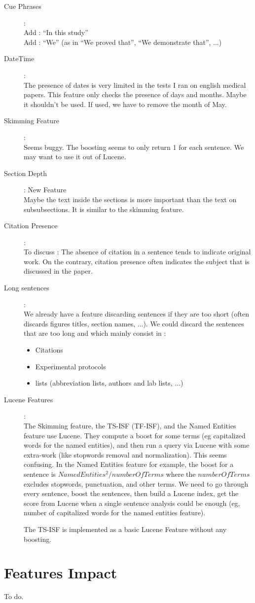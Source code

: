 \documentclass[a4paper,10pt]{article}
\begin{document}
\begin{description}
\item[Cue Phrases] : \hfill \\
  Add : ``In this study'' \\
  Add : ``We'' (as in ``We proved that'', ``We demonstrate that'',
  ...)\\
\item[DateTime] : \hfill \\
  The presence of dates is very limited in the tests I ran on english
  medical papers. This feature only checks the presence of days and
  months. Maybe it shouldn't be used. If used, we have to remove the
  month of May.

\item[Skimming Feature] : \hfill \\
  Seems buggy. The boosting seems to only return 1 for each
  sentence. We may want to use it out of Lucene.

\item[Section Depth] : New Feature \hfill \\
  Maybe the text inside the sections is more important than the text
  on subsubsections. It is similar to the skimming feature.

\item[Citation Presence] : \hfill \\
  To discuss : The absence of citation in a sentence tends to indicate
  original work. On the contrary, citation presence often indicates
  the subject that is discussed in the paper.
\item[Long sentences] : \hfill \\
  We already have a feature discarding sentences if they are too
  short (often discards figures titles, section names, ...). We could
  discard the sentences that are too long and which mainly consist in
  :
  \begin{itemize}
  \item Citations
  \item Experimental protocols
  \item lists (abbreviation lists, authors and lab lists, ...)
  \end{itemize}

\item[Lucene Features] : \hfill \\
  The Skimming feature, the TS-ISF (TF-ISF), and the Named Entities
  feature use Lucene. They compute a boost for some terms (eg
  capitalized words for the named entities), and then run a query via
  Lucene with some extra-work (like stopwords removal and
  normalization). This seems confusing. In the Named Entities feature
  for example, the boost for a sentence is $NamedEntities^2 /
  numberOfTerms$ where the $numberOfTerms$ excludes stopwords,
  punctuation, and other terms. We need to go through every sentence,
  boost the sentences, then build a Lucene index, get the score from
  Lucene when a single sentence analysis could be enough (eg, number
  of capitalized words for the named entities feature).

  The TS-ISF is implemented as a basic Lucene Feature without any
  boosting.

\end{description}


\section{Features Impact}
\label{sec:impact}

To do.
\end{document}
